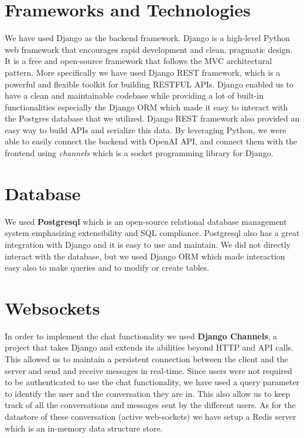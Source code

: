 \section{Frameworks and Technologies}
We have used Django as the backend framework.
Django is a high-level Python web framework that encourages rapid development and clean, pragmatic design.
It is a free and open-source framework that follows the MVC architectural pattern.
More specifically we have used Django REST framework, which is a powerful and flexible toolkit for building RESTFUL APIs.
Django enabled us to have a clean and maintainable codebase while providing a lot of built-in functionalities especially the Django ORM which made it easy to interact with the Postgres database that we utilized. Django REST framework also provided  an easy way to build APIs and serialize this data.
By leveraging Python, we were able to easily connect the backend with OpenAI API, and connect them with the frontend using \textit{channels} which is a socket programming library for Django.

\section{Database}
We used \textbf{Postgresql} which is an open-source relational database management system emphasizing extensibility and SQL compliance.
Postgresql also has a great integration with Django and it is easy to use and maintain.
We did not directly interact with the database, but we used Django ORM which made interaction easy also to make queries and to modify or create tables.

\section{Websockets}
In order to implement the chat functionality we used \textbf{Django Channels}, a project that takes Django and extends its abilities beyond HTTP and API calls.
This allowed us to maintain a persistent connection between the client and the server and send and receive messages in real-time.
Since users were not required to be authenticated to use the chat functionality, we have used a query parameter to identify the user and the conversation they are in.
This also allow us to keep track of all the conversations and messages sent by the different users.
As for the datastore of these conversation (active web-sockets) we have setup a Redis server which is an in-memory data structure store.

